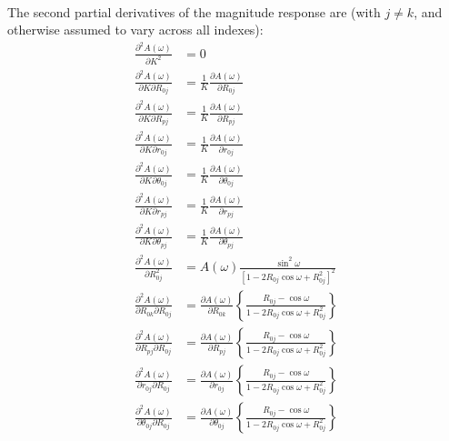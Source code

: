 \documentclass[a4paper,twoside,10pt,english]{report}
\begin{document}
\begin{raggedbottom}
\begin{align*}
\end{align*}
The second partial derivatives of the magnitude response are (with $j\ne k$, and otherwise assumed to vary across all indexes):
\begin{align*}
\frac{\partial^{2}A\left(\omega\right)}{\partial K^{2}} &= 0\\
\frac{\partial^{2}A\left(\omega\right)}{\partial K\partial R_{0j}} &= \frac{1}{K}\frac{\partial A\left(\omega\right)}{\partial R_{0j}}\\
\frac{\partial^{2}A\left(\omega\right)}{\partial K\partial R_{pj}} &= \frac{1}{K}\frac{\partial A\left(\omega\right)}{\partial R_{pj}}\\
\frac{\partial^{2}A\left(\omega\right)}{\partial K\partial r_{0j}} &= \frac{1}{K}\frac{\partial A\left(\omega\right)}{\partial r_{0j}}\\
\frac{\partial^{2}A\left(\omega\right)}{\partial K\partial\theta_{0j}} &= \frac{1}{K}\frac{\partial A\left(\omega\right)}{\partial\theta_{0j}} \\
\frac{\partial^{2}A\left(\omega\right)}{\partial K\partial r_{pj}} &= \frac{1}{K}\frac{\partial A\left(\omega\right)}{\partial r_{pj}}\\
\frac{\partial^{2}A\left(\omega\right)}{\partial K\partial\theta_{pj}} &= \frac{1}{K}\frac{\partial A\left(\omega\right)}{\partial\theta_{pj}} \\
\frac{\partial^{2}A\left(\omega\right)}{\partial R_{0j}^{2}} &= A\left(\omega\right)\frac{\sin^{2}\omega}{\left[1-2R_{0j}\cos\omega+R_{0j}^{2}\right]^{2}}\\
\frac{\partial^{2}A\left(\omega\right)}{\partial R_{0k}\partial R_{0j}} &= \frac{\partial A\left(\omega\right)}{\partial R_{0k}}\left\{ \frac{R_{0j}-\cos\omega}{1-2R_{0j}\cos\omega+R_{0j}^{2}}\right\} \\
\frac{\partial^{2}A\left(\omega\right)}{\partial R_{pj}\partial R_{0j}} &= \frac{\partial A\left(\omega\right)}{\partial R_{pj}}\left\{ \frac{R_{0j}-\cos\omega}{1-2R_{0j}\cos\omega+R_{0j}^{2}}\right\} \\
\frac{\partial^{2}A\left(\omega\right)}{\partial r_{0j}\partial R_{0j}} &= \frac{\partial A\left(\omega\right)}{\partial r_{0j}}\left\{ \frac{R_{0j}-\cos\omega}{1-2R_{0j}\cos\omega+R_{0j}^{2}}\right\} \\
\frac{\partial^{2}A\left(\omega\right)}{\partial\theta_{0j}\partial R_{0j}} &= \frac{\partial A\left(\omega\right)}{\partial\theta_{0j}}\left\{ \frac{R_{0j}-\cos\omega}{1-2R_{0j}\cos\omega+R_{0j}^{2}}\right\} \\

\end{align*}
\end{raggedbottom}
\end{document}
